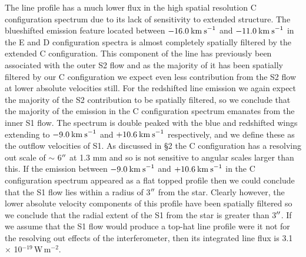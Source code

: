 \documentclass[iop]{emulateapj}
\begin{document}
The line profile has a much lower flux in the high spatial resolution C configuration spectrum due to its lack of sensitivity to extended structure. The blueshifted emission feature located between $-16.0\>{\rm km\>s}^{-1}$ and $-11.0\>{\rm km\>s}^{-1}$ in the E and D configuration spectra is almost completely spatially filtered by the extended C configuration. This component of the line has previously been associated with the outer S2 flow \citep{1987ApJ...313..400H} and as the majority of it has been spatially filtered by our C configuration we expect even less contribution from the S2 flow at lower absolute velocities still. For the redshifted line emission we again expect the majority of the S2 contribution to be spatially filtered, so we conclude that the majority of the emission in the C configuration spectrum emanates from the inner S1 flow. The spectrum is double peaked with the blue and redshifted wings extending to $-9.0\>{\rm km\>s}^{-1}$ and $+10.6\>{\rm km\>s}^{-1}$ respectively, and we define these as the outflow velocities of S1. As discussed in \S2 the C configuration has a resolving out scale of $\sim$ 6$\mbox{$^{\prime\prime}$}$ at 1.3 mm and so is not sensitive to angular scales larger than this. If the emission between $-9.0\>{\rm km\>s}^{-1}$ and $+10.6\>{\rm km\>s}^{-1}$ in the C configuration spectrum appeared as a flat topped profile then we could conclude that the S1 flow lies within a radius of 3$\mbox{$^{\prime\prime}$}$ from the star. Clearly however, the lower absolute velocity components of this profile have been spatially filtered so we conclude that the radial extent of the S1 from the star is greater than 3$\mbox{$^{\prime\prime}$}$. If we assume that the S1 flow would produce a top-hat line profile were it not for the resolving out effects of the interferometer, then its integrated line flux is 3.1 $\times$ 10${}^{-19}$\,W\,m${}^{-2}$.
\end{document}

